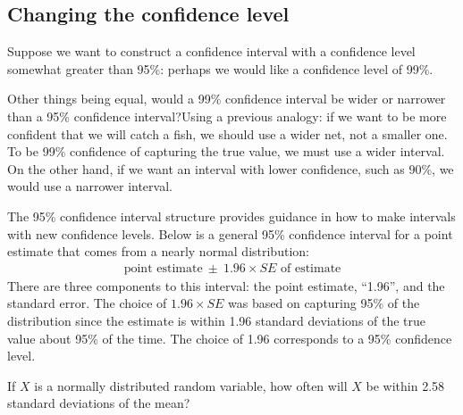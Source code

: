 \subsection{Changing the confidence level}
\label{changingTheConfidenceLevelSection}


Suppose we want to construct a confidence interval with a confidence level somewhat greater than 95\%: perhaps we would like a confidence level of 99\%. 

\begin{examplewrap}
\begin{nexample}{Other things being equal, would a 99\% confidence interval be wider or narrower than a 95\% confidence interval?}Using a previous analogy: if we want to be more confident that we will catch a fish, we should use a wider net, not a smaller one. To be 99\% confidence of capturing the true value, we must use a wider interval. On the other hand, if we want an interval with lower confidence, such as 90\%, we would use a narrower interval.
\end{nexample}
\end{examplewrap}

The 95\% confidence interval structure provides guidance in how to make intervals with new confidence levels. Below is a general 95\% confidence interval for a point estimate that comes from a nearly normal distribution:
\begin{eqnarray}
\text{point estimate}\ \pm\ 1.96\times SE \text{ of estimate}
\end{eqnarray}
There are three components to this interval: the point estimate, ``1.96'', and the standard error. The choice of $1.96\times SE$ was based on capturing 95\% of the distribution since the estimate is within 1.96 standard deviations of the true value about 95\% of the time. The choice of 1.96 corresponds to a 95\% confidence level. 

\begin{exercisewrap}
\begin{nexercise} \label{leadInForMakingA99PercentCIExercise}
If $X$ is a normally distributed random variable, how often will $X$ be within 2.58 standard deviations of the mean?\footnotemark
\end{nexercise}
\end{exercisewrap}


